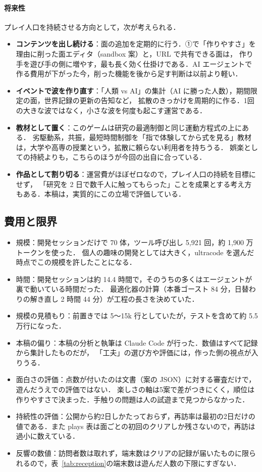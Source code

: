 \documentclass[a4paper,10pt]{ltjsarticle}
\newcommand{\tabref}[1]{表~\ref{#1}}
\begin{document}
\paragraph{将来性} プレイ人口を持続させる方向として，次が考えられる．
\begin{itemize}
  \item \textbf{コンテンツを出し続ける}：面の追加を定期的に行う．①で「作りやすさ」を理由に削った面エディタ（sandbox 案）と，URL で共有できる面は，
  作り手を遊び手の側に増やす，最も長く効く仕掛けである．AI エージェントで作る費用が下がった今，削った機能を後から足す判断は以前より軽い．
  \item \textbf{イベントで波を作り直す}：「人類 vs AI」の集計（AI に勝った人数），期間限定の面，世界記録の更新の告知など，
  拡散のきっかけを周期的に作る．1回の大きな波ではなく，小さな波を何度も起こす運営である．
  \item \textbf{教材として置く}：このゲームは研究の最適制御と同じ運動方程式の上にある．
  劣駆動系，共振，最短時間制御を「指で体験してから式を見る」教材は，大学や高専の授業という，拡散に頼らない利用者を持ちうる．
  娯楽としての持続よりも，こちらのほうが今回の出自に合っている．
  \item \textbf{作品として割り切る}：運営費がほぼゼロなので，プレイ人口の持続を目標にせず，
  「研究を 2 日で数千人に触ってもらった」ことを成果とする考え方もある．本稿は，実質的にこの立場で評価している．
\end{itemize}

\subsection{費用と限界}
\label{sec:limits}
\begin{itemize}
  \item 規模：開発セッションだけで 70 体，ツール呼び出し 5,921 回，約 1,900 万トークンを使った．
  個人の趣味の開発としては大きく，ultracode を選んだ時点でこの規模を許したことになる．
  \item 時間：開発セッションは約 14.4 時間で，そのうちの多くはエージェントが裏で動いている時間だった．
  最適化器の計算（本番ゴースト 84 分，日替わりの解き直し 2 時間 44 分）が工程の長さを決めていた．
  \item 規模の見積もり：前置きでは 5〜15k 行としていたが，テストを含めて約 5.5 万行になった．
  \item 本稿の偏り：本稿の分析と執筆は Claude Code が行った．数値はすべて記録から集計したものだが，
  「工夫」の選び方や評価には，作った側の視点が入りうる．
  \item 面白さの評価：点数が付いたのは文書（案の JSON）に対する審査だけで，遊んだうえでの評価ではない．
  楽しさの軸は5案で差がつきにくく，順位は作りやすさで決まった．手触りの問題は人の試遊まで見つからなかった．
  \item 持続性の評価：公開から約2日しかたっておらず，再訪率は最初の2日だけの値である．また plays 表は面ごとの初回のクリアしか残さないので，再訪は過小に数えている．
  \item 反響の数値：訪問者数は取れず，端末数はクリアの記録が届いたものに限られるので，\tabref{tab:reception}の端末数は遊んだ人数の下限にすぎない．
\end{itemize}
\end{document}
